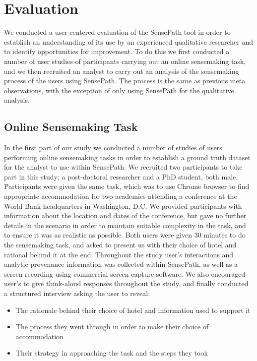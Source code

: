 \section{Evaluation}

We conducted a user-centered evaluation of the SensePath tool in order to establish an understanding of its use by an experienced qualitative researcher and to identify opportunities for improvement. To do this we first conducted a number of user studies of participants carrying out an online sensemaking task, and we then recruited an analyst to carry out an analysis of the sensemaking process of the users using SensePath. The process is the same as previous meta observations, with the exception of only using SensePath for the qualitative analysis.

\subsection{Online Sensemaking Task}
In the first part of our study we conducted a number of studies of users performing online sensemaking tasks in order to establish a ground truth dataset for the analyst to use within SensePath. We recruited two participants to take part in this study; a post-doctoral researcher and a PhD student, both male. Participants were given the same task, which was to use Chrome browser to find appropriate accommodation for two academics attending a conference at the World Bank headquarters in Washington, D.C. We provided participants with information about the location and dates of the conference, but gave no further details in the scenario in order to maintain suitable complexity in the task, and to ensure it was as realistic as possible. Both users were given 30 minutes to 	do the sensemaking task, and asked to present us with their choice of hotel and rational behind it at the end. Throughout the study user's interactions and analytic provenance information was collected within SensePath, as well as a screen recording using commercial screen capture software. We also encouraged user's to give think-aloud responses throughout the study, and finally conducted a structured interview asking the user to reveal:

\begin{itemize}
	\item The rationale behind their choice of hotel and information used to support it
	\item The process they went through in order to make their choice of accommodation
	\item Their strategy in approaching the task and the steps they took
\end{itemize}


